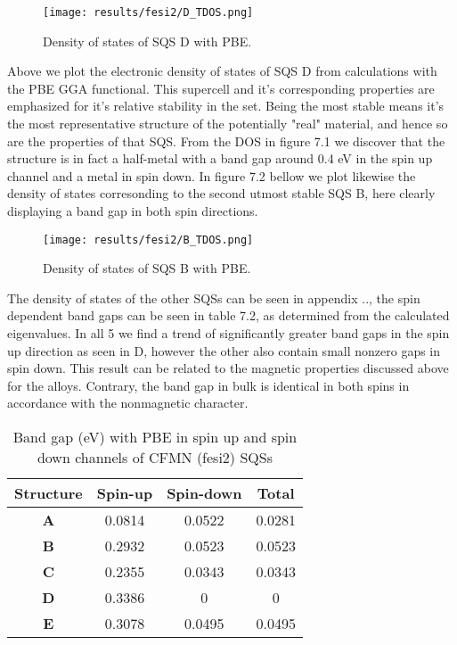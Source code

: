 \begin{figure}[H]
	\centering
	\texttt{[image: results/fesi2/D\_TDOS.png]}
	\caption{Density of states of SQS D  with PBE.}
\end{figure}

Above we plot the electronic density of states of SQS D from calculations with the PBE GGA functional. This supercell and it's corresponding properties are emphasized for it's relative stability in the set. Being the most stable means it's the most representative structure of the potentially "real" material, and hence so are the properties of that SQS. From the DOS in figure 7.1 we discover that the structure is in fact a half-metal with a band gap around 0.4 eV in the spin up channel and a metal in spin down. In figure 7.2 bellow we plot likewise the density of states corresonding to the second utmost stable SQS B, here clearly displaying a band gap in both spin directions. 

\begin{figure}[H]
\centering
	\texttt{[image: results/fesi2/B\_TDOS.png]}
	\caption{Density of states of SQS B  with PBE.}
\end{figure}  

The density of states of the other SQSs can be seen in appendix .., the spin dependent band gaps can be seen in table 7.2, as determined from the calculated eigenvalues. In all 5 we find a trend of significantly greater band gaps in the spin up direction as seen in D, however the other also contain small nonzero gaps in spin down. This result can be related to the magnetic properties discussed above for the alloys. Contrary, the band gap in bulk  is identical in both spins in accordance with the nonmagnetic character. 
 
\begin{table}[H]
\centering
\begin{tabular}{@{}cccc@{}}
\toprule
Structure  & Spin-up & Spin-down & Total  \\ \midrule
\textbf{A} & 0.0814  & 0.0522    & 0.0281 \\
\textbf{B} & 0.2932  & 0.0523    & 0.0523 \\
\textbf{C} & 0.2355  & 0.0343    & 0.0343 \\
\textbf{D} & 0.3386  & 0         & 0      \\
\textbf{E} & 0.3078  & 0.0495    & 0.0495 \\ \bottomrule
\end{tabular}
\caption{Band gap (eV) with PBE in spin up and spin down channels of CFMN (fesi2) SQSs}
\end{table}
  
